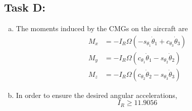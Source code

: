 \documentclass[a4paper]{article}
\begin{document}
\subsection*{Task D:}%
\begin{enumerate}[a.]
  \item  The moments induced by the CMGs on the aircraft are
    \[
      \begin{aligned}
        M_x &= -I_R \Omega(-s_{\theta_1} \dot{\theta}_1 + c_{\theta_3} \dot{\theta}_3)\\
        M_y &= -I_R \Omega(c_{\theta_1} \dot{\theta}_1 - s_{\theta_2} \dot{\theta}_2) \\
        M_z &= -I_R \Omega(c_{\theta_2} \dot{\theta}_2 - s_{\theta_3} \dot{\theta}_3)
      \end{aligned}
    \]
  \item In order to ensure the desired angular accelerations, 
    \[
      I_R \geq 11.9056
    \]
\end{enumerate}
\end{document}
